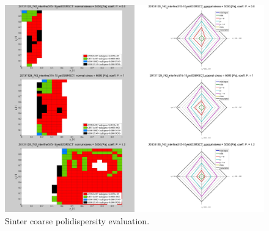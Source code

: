 \begin{figure}[!htb]
\centering
\includegraphics[width=.96\columnwidth]{images/087sinter31510}
\caption[Sinter coarse polidispersity evaluation]{Sinter coarse polidispersity
evaluation.}
\label{fig:087sinter31510}
\end{figure}